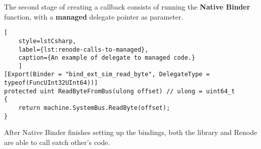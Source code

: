 \pagebreak

\noindent
The second stage of creating a callback consists of running the \textbf{Native Binder} function, with a \textbf{managed}
delegate pointer as parameter.

\begin{lstlisting}[
    style=lstCsharp,
    label={lst:renode-calls-to-managed},
    caption={An example of delegate to managed code.}
    ]
[Export(Binder = "bind_ext_sim_read_byte", DelegateType = typeof(FuncUInt32UInt64))]
protected uint ReadByteFromBus(ulong offset) // ulong = uint64_t
{
    return machine.SystemBus.ReadByte(offset);
}
\end{lstlisting}

\noindent
After Native Binder finishes setting up the bindings, both the library and Renode are able to call eatch other's code.